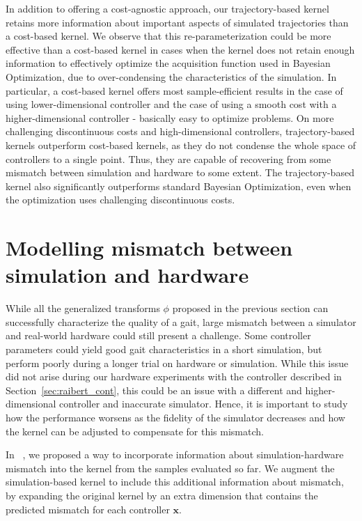In addition to offering a cost-agnostic approach, our trajectory-based kernel retains more information about important aspects of simulated trajectories than a cost-based  kernel. We observe that this re-parameterization could be more effective than a cost-based kernel in cases when the kernel does not retain enough information to effectively optimize the acquisition function used in Bayesian Optimization, due to over-condensing the characteristics of the simulation. In particular, a cost-based kernel offers most sample-efficient results in the case of using lower-dimensional controller and the case of using a smooth cost with a higher-dimensional controller - basically easy to optimize problems. On more challenging discontinuous costs and high-dimensional controllers, trajectory-based kernels outperform cost-based kernels, as they do not condense the whole space of controllers to a single point. Thus, they are capable of recovering from some mismatch between simulation and hardware to some extent. 
The trajectory-based kernel also significantly outperforms standard Bayesian Optimization, even when the optimization uses challenging discontinuous costs. 


\section{Modelling mismatch between simulation and hardware}
\label{sec:mismatch}
While all the generalized transforms $\phi$ proposed in the previous section can successfully characterize the quality of a gait, large mismatch between a simulator and real-world hardware could still present a challenge. Some controller parameters could yield good gait characteristics in a short simulation, but perform poorly during a longer trial on hardware or simulation. While this issue did not arise during our hardware experiments with the controller described in Section~\ref{sec:raibert_cont}, this could be an issue with a different and higher-dimensional controller and inaccurate simulator. Hence, it is important to study how the performance worsens as the fidelity of the simulator decreases and how the kernel can be adjusted to compensate for this mismatch.

In ~\cite{rai2017bayesian}, we proposed a way to incorporate information about simulation-hardware mismatch into the kernel from the samples evaluated so far. We augment the simulation-based kernel to include this additional information about mismatch, by expanding the original kernel by an extra dimension that contains the predicted mismatch for each controller $\pmb{x}$.
 
